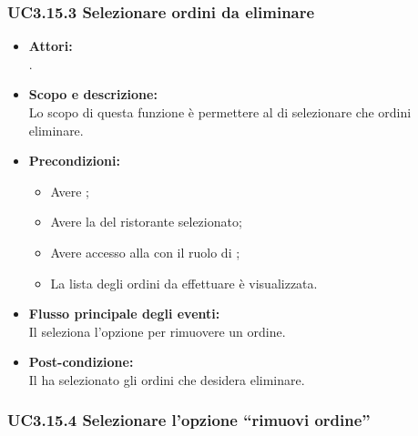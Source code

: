 \subsubsection{UC3.15.3 Selezionare ordini da eliminare} \label{UC3.15.3}

\begin{itemize}
	\item \textbf{Attori:}
	\\.
	\item \textbf{Scopo e descrizione:} 
	\\Lo scopo di questa funzione è permettere al  di selezionare che ordini eliminare.
	\item \textbf{Precondizioni:}
	\begin{itemize}
		\item Avere ;
		\item Avere la  del ristorante selezionato;
		\item Avere accesso alla  con il ruolo di ;
		\item La lista degli ordini da effettuare è visualizzata.
	\end{itemize}
	\item \textbf{Flusso principale degli eventi:}
	\\Il {} seleziona l'opzione per rimuovere un ordine.
	\item \textbf{Post-condizione:}
	\\Il {} ha selezionato gli ordini che desidera eliminare.
\end{itemize}

\subsubsection{UC3.15.4 Selezionare l'opzione “rimuovi ordine”} \label{UC3.15.4}

